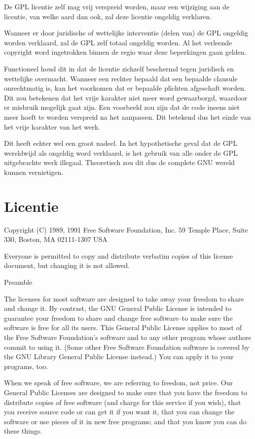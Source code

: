 De GPL licentie zelf mag vrij verspreid worden, maar een wijziging aan de licentie, van welke aard dan ook, zal deze licentie ongeldig verklaren. 

Wanneer er door juridische of wettelijke interventie (delen van) de GPL ongeldig worden verklaard, zal de GPL zelf totaal ongeldig worden. Al het verleende copyright word ingetrokken binnen de regio waar deze beperkingen gaan gelden. 

Functioneel houd dit in dat de licentie zichzelf beschermd tegen juridisch en wettelijke overmacht. Wanneer een rechter bepaald dat een bepaalde clausule onrechtmatig is, kan het voorkomen dat er bepaalde plichten afgeschaft worden. Dit zou betekenen dat het vrije karakter niet meer word gewaarborgd, waardoor er misbruik mogelijk gaat zijn. Een voorbeeld zou zijn dat de code ineens niet meer hoeft te worden verspreid na het aanpassen. Dit betekend dus het einde van het vrije karakter van het werk. 

Dit heeft echter wel een groot nadeel. In het hypothetische geval dat de GPL wereldwijd als ongeldig word verklaard, is het gebruik van alle onder de GPL uitgebrachte werk illegaal. Theoretisch zou dit dus de complete GNU wereld kunnen vernietigen. 

\section{Licentie}
Copyright (C) 1989, 1991 Free Software Foundation, Inc.
59 Temple Place, Suite 330, Boston, MA 02111-1307 USA

Everyone is permitted to copy and distribute verbatim copies
of this license document, but changing it is not allowed.

Preamble

The licenses for most software are designed to take away your freedom to share and change it. By contrast, the GNU General Public License is intended to guarantee your freedom to share and change free software--to make sure the software is free for all its users. This General Public License applies to most of the Free Software Foundation's software and to any other program whose authors commit to using it. (Some other Free Software Foundation software is covered by the GNU Library General Public License instead.) You can apply it to your programs, too.

When we speak of free software, we are referring to freedom, not price. Our General Public Licenses are designed to make sure that you have the freedom to distribute copies of free software (and charge for this service if you wish), that you receive source code or can get it if you want it, that you can change the software or use pieces of it in new free programs; and that you know you can do these things.


